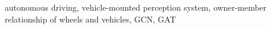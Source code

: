 \documentclass{article}
\begin{document}
\begin{keywords}
autonomous driving, vehicle-mounted perception system, owner-member relationship of wheels and vehicles, GCN, GAT 
\end{keywords}


\end{document}
